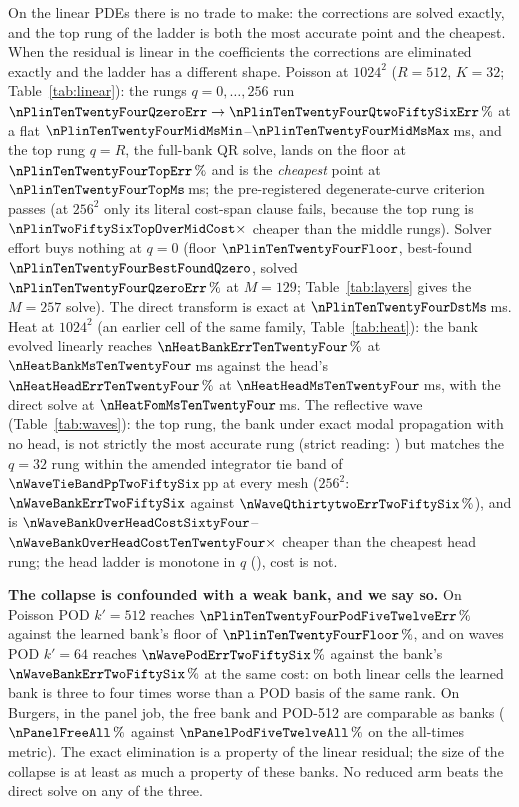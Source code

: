 On the linear PDEs there is no trade to make: the corrections are solved
exactly, and the top rung of the ladder is both the most accurate point and the
cheapest. When the residual is linear in the coefficients the corrections are
eliminated exactly and the ladder has a different shape. Poisson at $1024^2$ ($R=512$,
$K=32$; Table~\ref{tab:linear}): the rungs $q=0,\dots,256$ run
$\nPlinTenTwentyFourQzeroErr\to\nPlinTenTwentyFourQtwoFiftySixErr\,\%$ at a flat
$\nPlinTenTwentyFourMidMsMin$--$\nPlinTenTwentyFourMidMsMax$\,ms, and the top
rung $q=R$, the full-bank QR solve, lands on the floor at
$\nPlinTenTwentyFourTopErr\,\%$ and is the \emph{cheapest} point at
$\nPlinTenTwentyFourTopMs$\,ms; the pre-registered degenerate-curve criterion
passes (at $256^2$ only its literal cost-span clause fails, because the top
rung is $\nPlinTwoFiftySixTopOverMidCost\times$ cheaper than the middle rungs).
Solver effort buys nothing at $q=0$ (floor $\nPlinTenTwentyFourFloor$,
best-found $\nPlinTenTwentyFourBestFoundQzero$, solved
$\nPlinTenTwentyFourQzeroErr\,\%$ at $M=129$; Table~\ref{tab:layers} gives the
$M=257$ solve). The direct transform is
exact at $\nPlinTenTwentyFourDstMs$\,ms. Heat at
$1024^2$ (an earlier cell of the same family, Table~\ref{tab:heat}): the bank
evolved linearly reaches $\nHeatBankErrTenTwentyFour\,\%$ at
$\nHeatBankMsTenTwentyFour$\,ms against the head's
$\nHeatHeadErrTenTwentyFour\,\%$ at $\nHeatHeadMsTenTwentyFour$\,ms, with the
direct solve at $\nHeatFomMsTenTwentyFour$\,ms. The reflective wave
(Table~\ref{tab:waves}): the top rung, the bank under exact modal propagation
with no head, is not strictly the most accurate rung (strict reading:
\nWaveTopStrictBestTwoFiftySix{}) but matches the $q=32$ rung within the
amended integrator tie band of $\nWaveTieBandPpTwoFiftySix$\,pp at every
mesh ($256^2$: $\nWaveBankErrTwoFiftySix$ against
$\nWaveQthirtytwoErrTwoFiftySix\,\%$), and is
$\nWaveBankOverHeadCostSixtyFour$--$\nWaveBankOverHeadCostTenTwentyFour\times$
cheaper than the cheapest head rung; the head ladder is monotone in $q$
(\nWaveHeadLadderMonotoneTwoFiftySix{}), cost is not.

\textbf{The collapse is confounded with a weak bank, and we say so.} On
Poisson POD $k'=512$ reaches $\nPlinTenTwentyFourPodFiveTwelveErr\,\%$ against
the learned bank's floor of $\nPlinTenTwentyFourFloor\,\%$, and on waves POD
$k'=64$ reaches $\nWavePodErrTwoFiftySix\,\%$ against the bank's
$\nWaveBankErrTwoFiftySix\,\%$ at the same cost: on both linear cells the
learned bank is three to four times worse than a POD basis of the same rank.
On Burgers, in the panel job, the free bank and POD-512 are comparable as
banks ($\nPanelFreeAll\,\%$ against $\nPanelPodFiveTwelveAll\,\%$ on the
all-times metric). The exact elimination is a property of the linear residual; the size of the
collapse is at least as much a property of these banks. No reduced arm beats
the direct solve on any of the three.

